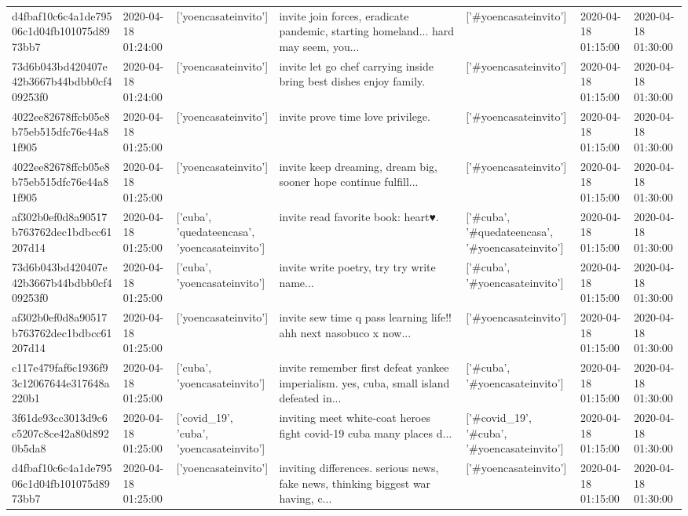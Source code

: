 \begin{tabular}{lllllll}
d4fbaf10c6c4a1de79506c1d04fb101075d8973bb7 & 2020-04-18 01:24:00 & ['yoencasateinvito'] & invite join forces, eradicate pandemic, starting homeland... hard may seem, you... & ['#yoencasateinvito'] & 2020-04-18 01:15:00 & 2020-04-18 01:30:00 \\
73d6b043bd420407e42b3667b44bdbb0cf409253f0 & 2020-04-18 01:24:00 & ['yoencasateinvito'] & invite let go chef carrying inside bring best dishes enjoy family. & ['#yoencasateinvito'] & 2020-04-18 01:15:00 & 2020-04-18 01:30:00 \\
4022ee82678ffcb05e8b75eb515dfc76e44a81f905 & 2020-04-18 01:25:00 & ['yoencasateinvito'] & invite prove time love privilege. & ['#yoencasateinvito'] & 2020-04-18 01:15:00 & 2020-04-18 01:30:00 \\
4022ee82678ffcb05e8b75eb515dfc76e44a81f905 & 2020-04-18 01:25:00 & ['yoencasateinvito'] & invite keep dreaming, dream big, sooner hope continue fulfill... & ['#yoencasateinvito'] & 2020-04-18 01:15:00 & 2020-04-18 01:30:00 \\
af302b0ef0d8a90517b763762dec1bdbcc61207d14 & 2020-04-18 01:25:00 & ['cuba', 'quedateencasa', 'yoencasateinvito'] & invite read favorite book: heart♥️. & ['#cuba', '#quedateencasa', '#yoencasateinvito'] & 2020-04-18 01:15:00 & 2020-04-18 01:30:00 \\
73d6b043bd420407e42b3667b44bdbb0cf409253f0 & 2020-04-18 01:25:00 & ['cuba', 'yoencasateinvito'] & invite write poetry, try try write name... & ['#cuba', '#yoencasateinvito'] & 2020-04-18 01:15:00 & 2020-04-18 01:30:00 \\
af302b0ef0d8a90517b763762dec1bdbcc61207d14 & 2020-04-18 01:25:00 & ['yoencasateinvito'] & invite sew time q pass learning life!! ahh next nasobuco x now... & ['#yoencasateinvito'] & 2020-04-18 01:15:00 & 2020-04-18 01:30:00 \\
c117e479faf6c1936f93c12067644e317648a220b1 & 2020-04-18 01:25:00 & ['cuba', 'yoencasateinvito'] & invite remember first defeat yankee imperialism. yes, cuba, small island defeated in... & ['#cuba', '#yoencasateinvito'] & 2020-04-18 01:15:00 & 2020-04-18 01:30:00 \\
3f61de93cc3013d9c6c5207c8ce42a80d8920b5da8 & 2020-04-18 01:25:00 & ['covid_19', 'cuba', 'yoencasateinvito'] & inviting meet white-coat heroes fight covid-19 cuba many places d... & ['#covid_19', '#cuba', '#yoencasateinvito'] & 2020-04-18 01:15:00 & 2020-04-18 01:30:00 \\
d4fbaf10c6c4a1de79506c1d04fb101075d8973bb7 & 2020-04-18 01:25:00 & ['yoencasateinvito'] & inviting differences. serious news, fake news, thinking biggest war having, c... & ['#yoencasateinvito'] & 2020-04-18 01:15:00 & 2020-04-18 01:30:00 \\

\end{tabular}
